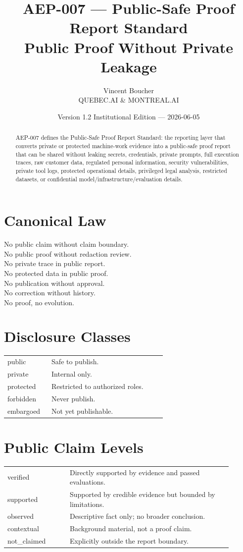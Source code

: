 \documentclass[11pt]{article}
\title{\textbf{AEP-007 --- Public-Safe Proof Report Standard}\\\large Public Proof Without Private Leakage}
\author{Vincent Boucher\\QUEBEC.AI \& MONTREAL.AI}
\date{Version 1.2 Institutional Edition --- 2026-06-05}
\begin{document}
\maketitle
\begin{abstract}
AEP-007 defines the Public-Safe Proof Report Standard: the reporting layer that converts private or protected machine-work evidence into a public-safe proof report that can be shared without leaking secrets, credentials, private prompts, full execution traces, raw customer data, regulated personal information, security vulnerabilities, private tool logs, protected operational details, privileged legal analysis, restricted datasets, or confidential model/infrastructure/evaluation details.
\end{abstract}
\section*{Canonical Law}
No public claim without claim boundary.\\
No public proof without redaction review.\\
No private trace in public report.\\
No protected data in public proof.\\
No publication without approval.\\
No correction without history.\\
No proof, no evolution.
\section{Disclosure Classes}
\begin{longtable}{p{0.25\linewidth}p{0.65\linewidth}}
public & Safe to publish.\\
private & Internal only.\\
protected & Restricted to authorized roles.\\
forbidden & Never publish.\\
embargoed & Not yet publishable.\\
\end{longtable}
\section{Public Claim Levels}
\begin{longtable}{p{0.25\linewidth}p{0.65\linewidth}}
verified & Directly supported by evidence and passed evaluations.\\
supported & Supported by credible evidence but bounded by limitations.\\
observed & Descriptive fact only; no broader conclusion.\\
contextual & Background material, not a proof claim.\\
not\_claimed & Explicitly outside the report boundary.\\
\end{longtable}
\end{document}
